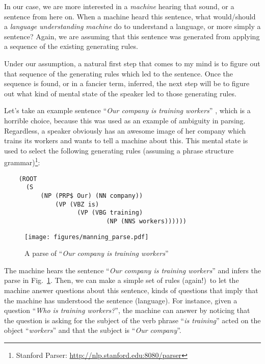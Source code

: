 \documentclass{report}
\begin{document}
In our case, we are more interested in a \emph{machine} hearing that sound, or a
sentence from here on. When a machine heard this sentence, what would/should a
\emph{language understanding machine} do to understand a language, or more simply
a sentence? Again, we are assuming that this sentence was generated from
applying a sequence of the existing generating rules. 

Under our assumption, a natural first step that comes to my mind is to figure
out that sequence of the generating rules which led to the sentence. Once the
sequence is found, or in a fancier term, inferred, the next step will be to
figure out what kind of mental state of the speaker led to those generating
rules. 

Let's take an example sentence ``\emph{Our company is training workers}''
\citep[Sec.~1.3]{manning1999foundations}, which is a horrible choice, because
this was used as an example of ambiguity in parsing. Regardless, a speaker
obviously has an awesome image of her company which trains its workers and wants
to tell a machine about this. This mental state is used to select the following
generating rules (assuming a phrase structure grammar)\footnote{
    Stanford Parser: \url{http://nlp.stanford.edu:8080/parser}
}:
\begin{verbatim}
    (ROOT
      (S
          (NP (PRP$ Our) (NN company))
              (VP (VBZ is)
                    (VP (VBG training)
                            (NP (NNS workers))))))
\end{verbatim}

\begin{figure}[ht]
    \centering
    \texttt{[image: figures/manning\_parse.pdf]}
    \caption{A parse of ``\emph{Our company is training workers}''}
    \label{fig:manning_parse}
\end{figure}

The machine hears the sentence ``\emph{Our company is training workers}'' and
infers the parse in Fig.~\ref{fig:manning_parse}. Then, we can make a simple set
of rules (again!)\ to let the machine answer questions about this sentence, kinds
of questions that imply that the machine has understood the sentence (language).
For instance, given a question ``\emph{Who is training workers?}'', the machine
can answer by noticing that the question is asking for the subject of the verb
phrase
``\emph{is training}'' acted on the object ``\emph{workers}'' and that the subject
is ``\emph{Our company}''.
\end{document}
